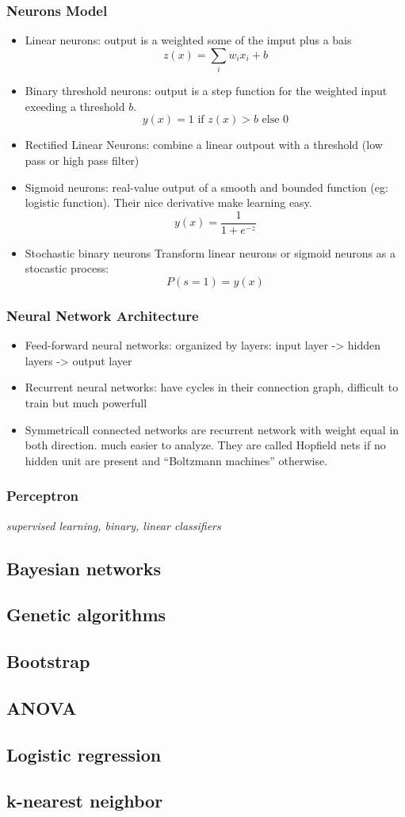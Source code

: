 \documentclass[twocolumn]{article}
\numberwithin{equation}{section}
\begin{document}
		\subsubsection{Neurons Model}
\begin{itemize}
\item Linear neurons: output is a weighted some of the imput plus a bais 
$$z(x) = \sum_i w_i x_i + b$$
\item Binary threshold neurons: output is a step function for the weighted input exeeding a threshold $b$. 
$$y(x) = 1 \text{ if } z(x)>b \text{ else }0$$
\item Rectified Linear Neurons: combine a linear outpout with a threshold (low pass or high pass filter)
\item Sigmoid neurons: real-value output of a smooth and bounded function (eg: logistic function). Their nice derivative make learning easy.
$$ y(x) =\frac{1}{1+e^{-z}}$$
\item Stochastic binary neurons
Transform linear neurons or sigmoid neurons as a stocastic process:
$$P(s=1)=y(x)$$ 
\end{itemize}

		\subsubsection{Neural Network Architecture}
\begin{itemize}
\item Feed-forward neural networks: organized by layers: input layer -> hidden layers -> output layer
\item Recurrent neural networks: have cycles in their connection graph, difficult to train but much powerfull
\item Symmetricall connected networks are recurrent network with weight equal in both direction. much easier to analyze. They are called Hopfield nets if no hidden unit are present and “Boltzmann machines” otherwise.
\end{itemize}

		\subsubsection{Perceptron}
\textit{supervised learning, binary, linear classifiers}

	\subsection{Bayesian networks}
	\subsection{Genetic algorithms}
	\subsection{Bootstrap}
	\subsection{ANOVA}
	\subsection{Logistic regression}
	\subsection{k-nearest neighbor}




	
	
\end{document}
